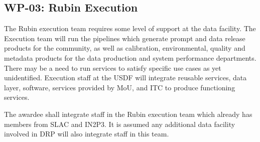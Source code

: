 \subsection{\textbf{WP-03}: Rubin Execution}
\label{sect:wp03}
The Rubin execution team requires some level of support at the data facility.
The Execution team will run the pipelines which generate prompt and data release products for the community, as well as \gls{calibration}, environmental, quality and \gls{metadata} products for the data production and system performance departments.
There may be a need to run services to satisfy specific use cases as yet unidentified.
Execution staff at the \gls{USDF} will integrate reusable services, data layer, software, services provided by MoU, and \gls{ITC} to produce functioning 
services.

\reqsimp{}{}{}{}{}
{
The awardee shall integrate staff in the Rubin execution team which 
already has members from \gls{SLAC} and
 \gls{IN2P3}. It is assumed any additional data facility involved in \gls{DRP} 
will also integrate staff in this team.
}


